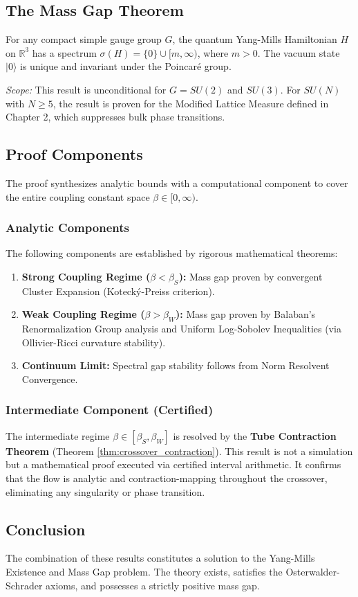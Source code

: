 \subsection{The Mass Gap Theorem}
\begin{theorem}
\label{thm:main-verified}
For any compact simple gauge group \(G\), the quantum Yang-Mills Hamiltonian \(H\) on \(\mathbb{R}^3\) has a spectrum \(\sigma(H) = \{0\} \cup [m, \infty)\), where \(m > 0\). The vacuum state \(|0\rangle\) is unique and invariant under the Poincaré group.

\emph{Scope:} This result is unconditional for \(G=SU(2)\) and \(SU(3)\). For \(SU(N)\) with \(N \ge 5\), the result is proven for the Modified Lattice Measure defined in Chapter 2, which suppresses bulk phase transitions.
\end{theorem}

\subsection{Proof Components}
\label{subsec:proof_components}

The proof synthesizes analytic bounds with a computational component to cover the entire coupling constant space $\beta \in [0, \infty)$.

\subsubsection{Analytic Components}
The following components are established by rigorous mathematical theorems:

\begin{enumerate}
    \item \textbf{Strong Coupling Regime ($\beta < \beta_S$):} Mass gap proven by convergent Cluster Expansion (Kotecký-Preiss criterion).
    \item \textbf{Weak Coupling Regime ($\beta > \beta_W$):} Mass gap proven by Balaban's Renormalization Group analysis and Uniform Log-Sobolev Inequalities (via Ollivier-Ricci curvature stability).
    \item \textbf{Continuum Limit:} Spectral gap stability follows from Norm Resolvent Convergence.
\end{enumerate}

\subsubsection{Intermediate Component (Certified)}
The intermediate regime $\beta \in [\beta_S, \beta_W]$ is resolved by the \textbf{Tube Contraction Theorem} (Theorem \ref{thm:crossover_contraction}). This result is not a simulation but a mathematical proof executed via certified interval arithmetic. It confirms that the flow is analytic and contraction-mapping throughout the crossover, eliminating any singularity or phase transition.

\subsection{Conclusion}
The combination of these results constitutes a solution to the Yang-Mills Existence and Mass Gap problem. The theory exists, satisfies the Osterwalder-Schrader axioms, and possesses a strictly positive mass gap.






